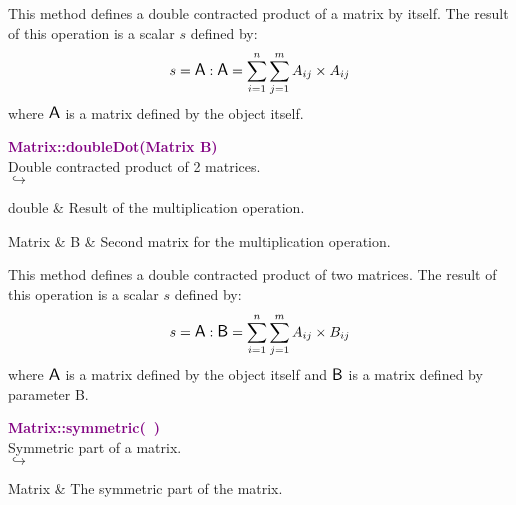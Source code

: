 This method defines a double contracted product of a matrix by itself.
The result of this operation is a scalar $s$ defined by:
\begin{equation*}
s = \mbox{\large\ensuremath{\mathsf{A}}} : \mbox{\large\ensuremath{\mathsf{A}}} = \sum_{i=1}^{n} \sum_{j=1}^{m} A_{ij}\times A_{ij}
\end{equation*}
where $\mbox{\large\ensuremath{\mathsf{A}}}$ is a matrix defined by the object itself.

\textcolor{purple}{\textbf{Matrix::doubleDot(Matrix B)}}\label{Matrix::doubleDot(Matrix B)}\\
Double contracted product of 2 matrices.\\ \hspace*{5mm}$\hookrightarrow$
\vspace*{-2em}\begin{tcolorbox}[grow to left by=-1cm, width=\textwidth-1cm,myArgs,tabularx={l|R}]
double & Result of the multiplication operation.
\end{tcolorbox}

\begin{tcolorbox}[width=\textwidth,myArgs,tabularx={ll|R}]
Matrix & B & Second matrix for the multiplication operation.
\end{tcolorbox}

This method defines a double contracted product of two matrices.
The result of this operation is a scalar $s$ defined by:
\begin{equation*}
s = \mbox{\large\ensuremath{\mathsf{A}}} : \mbox{\large\ensuremath{\mathsf{B}}} = \sum_{i=1}^{n} \sum_{j=1}^{m} A_{ij}\times B_{ij}
\end{equation*}
where $\mbox{\large\ensuremath{\mathsf{A}}}$ is a matrix defined by the object itself and $\mbox{\large\ensuremath{\mathsf{B}}}$ is a matrix defined by parameter B.

\textcolor{purple}{\textbf{Matrix::symmetric(~)}}\label{Matrix::symmetric()}\\
Symmetric part of a matrix.\\ \hspace*{5mm}$\hookrightarrow$
\vspace*{-2em}\begin{tcolorbox}[grow to left by=-1cm, width=\textwidth-1cm,myArgs,tabularx={l|R}]
Matrix & The symmetric part of the matrix.
\end{tcolorbox}


